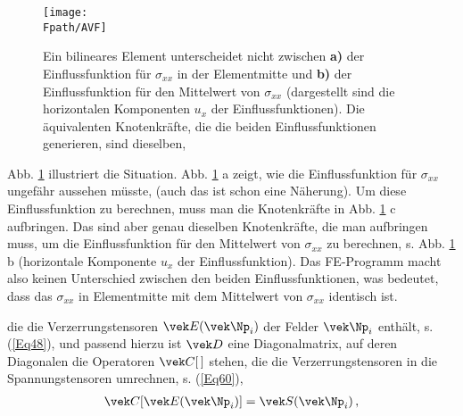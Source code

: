 {%
\begin{figure}[tbp]
\if {} \sidecaption \fi
\texttt{[image: \\Fpath/AVF]}
\caption{Ein bilineares Element unterscheidet nicht zwischen {\bf a)\/} der Einflussfunktion f\"{u}r $\sigma_{xx}$ in der Elementmitte und {\bf b)\/} der Einflussfunktion f\"{u}r den Mittelwert von $\sigma_{xx}$ (dargestellt sind die horizontalen Komponenten $u_x$ der Einflussfunktionen). Die \"{a}quivalenten Knotenkr\"{a}fte, die die beiden Einflussfunktionen generieren, sind dieselben, \cite{Ha5}} \label{Avf}
\end{figure}%

Abb. \ref{Avf} illustriert die Situation. Abb. \ref{Avf} a zeigt, wie die Einflussfunktion f\"{u}r $\sigma_{xx}$ ungef\"{a}hr aussehen m\"{u}sste, (auch das ist schon eine N\"{a}herung). Um diese Einflussfunktion zu berechnen, muss man die Knotenkr\"{a}fte in Abb. \ref{Avf} c aufbringen. Das sind aber genau dieselben Knotenkr\"{a}fte, die man aufbringen muss, um die Einflussfunktion f\"{u}r den Mittelwert von $\sigma_{xx}$ zu berechnen, s. Abb. \ref{Avf} b (horizontale Komponente $u_x$ der Einflussfunktion). Das FE-Programm macht also keinen Unterschied zwischen den beiden Einflussfunktionen, was bedeutet, dass das $\sigma_{xx}$ in Elementmitte mit dem Mittelwert von $\sigma_{xx}$ identisch ist.



die die Verzerrungstensoren $\vek E(\vek \Np_i)$ der Felder $\vek \Np_i$ enth\"{a}lt, s. (\ref{Eq48}), und passend hierzu ist $\vek D$ eine Diagonalmatrix, auf deren Diagonalen die Operatoren $\vek C[\,]$ stehen, die die Verzerrungstensoren in die Spannungstensoren umrechnen, s. (\ref{Eq60}),
\begin{align}
\vek C[\vek E(\vek \Np_i)] = \vek S(\vek \Np_i)\,,
\end{align}

}
